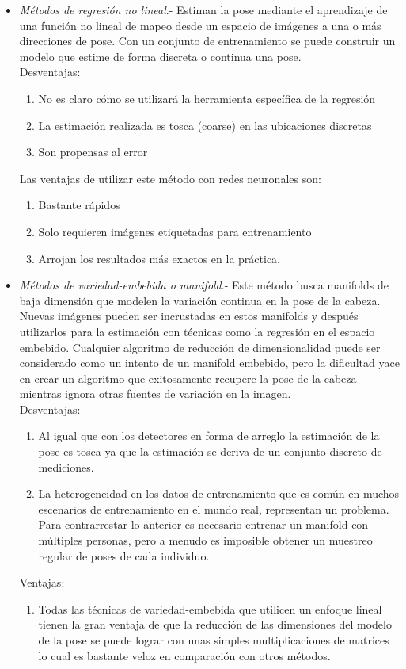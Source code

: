 \begin{itemize}
   	\item \textit{Métodos de regresión no lineal}.- Estiman la pose mediante el aprendizaje de una función no lineal de mapeo desde un espacio de imágenes a una o más direcciones de pose. Con un conjunto de entrenamiento se puede construir un modelo que estime de forma discreta o continua una pose.
   	\\Desventajas:
   	\begin{enumerate}[label=(\alph*)]
   		\item No es claro cómo se utilizará la herramienta específica de la regresión
   		\item La estimación realizada es tosca (coarse) en las ubicaciones discretas
   		\item Son propensas al error
   	\end{enumerate}
   	
   	Las ventajas de utilizar este método con redes neuronales son:
   	\begin{enumerate}[label=(\alph*)]
   		\item Bastante rápidos
   		\item Solo requieren imágenes etiquetadas para entrenamiento
   		\item Arrojan los resultados más exactos en la práctica.
   	\end{enumerate}
   	
   	\item \textit{Métodos de variedad-embebida o manifold}.- Este método busca manifolds de baja dimensión que modelen la variación continua en la pose de la cabeza. Nuevas imágenes pueden ser incrustadas en estos manifolds y después utilizarlos para la estimación con técnicas como la regresión en el espacio embebido. Cualquier algoritmo de reducción de dimensionalidad puede ser considerado como un intento de un manifold embebido, pero la dificultad yace en crear un algoritmo que exitosamente recupere la pose de la cabeza mientras ignora otras fuentes de variación en la imagen.
   	\\Desventajas:
   	\begin{enumerate}[label=(\alph*)]
   		\item Al igual que con los detectores en forma de arreglo la estimación de la pose es tosca ya que la estimación se deriva de un conjunto discreto de mediciones.
   		\item La heterogeneidad en los datos de entrenamiento que es común en muchos escenarios de entrenamiento en el mundo real, representan un problema. Para contrarrestar lo anterior es necesario entrenar un manifold con múltiples personas, pero a menudo es imposible obtener un muestreo regular de poses de cada individuo.
   	\end{enumerate}
   	Ventajas:
   	\begin{enumerate}[label=(\alph*)]
   		\item Todas las técnicas de variedad-embebida que utilicen un enfoque lineal tienen la gran ventaja de que la reducción de las dimensiones del modelo de la pose se puede lograr con unas simples multiplicaciones de matrices lo cual es bastante veloz en comparación con otros métodos.
   	\end{enumerate}
   	

\end{itemize}
